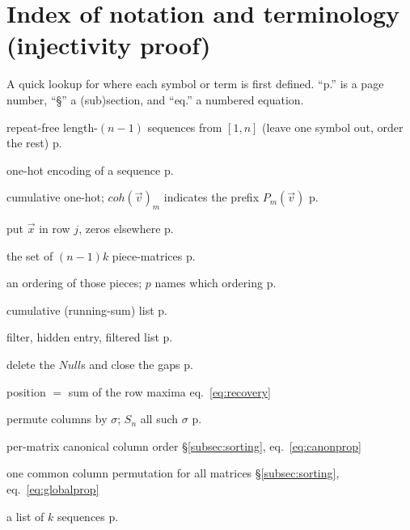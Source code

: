 \section{Index of notation and terminology (injectivity proof)}
\label{app:notation}

A quick lookup for where each symbol or term is first defined.  ``p.'' is a page
number, ``\S'' a (sub)section, and ``eq.'' a numbered equation.

\renewcommand{\arraystretch}{1.25}
\begin{description}\setlength{\itemsep}{1pt}
\item[$s(n)$] repeat-free length-$(n{-}1)$ sequences from $[1,n]$ (leave one symbol out, order the rest) \dotfill p.~\pageref{def:sn}
\item[$oh(\vec v)$] one-hot encoding of a sequence \dotfill p.~\pageref{def:oh}
\item[$coh(\vec v)$] cumulative one-hot; $coh(\vec v)_m$ indicates the prefix $P_m(\vec v)$ \dotfill p.~\pageref{def:coh}
\item[$mat(\vec x,j)$] put $\vec x$ in row $j$, zeros elsewhere \dotfill p.~\pageref{def:mat}
\item[$U(\cdots)$] the set of $(n{-}1)k$ piece-matrices \dotfill p.~\pageref{def:U}
\item[$\vec U(\cdots;p)$, $p$] an ordering of those pieces; $p$ names which ordering \dotfill p.~\pageref{def:ordering}
\item[$C\vec U$] cumulative (running-sum) list \dotfill p.~\pageref{def:CU}
\item[$\vec f$, $Null$, $FC\vec U$] filter, hidden entry, filtered list \dotfill p.~\pageref{def:FCU}
\item[$clean$] delete the $Null$s and close the gaps \dotfill p.~\pageref{def:clean}
\item[position recovery] position $=$ sum of the row maxima \dotfill eq.~\eqref{eq:recovery}
\item[$colPerm(m,\sigma)$, $S_n$] permute columns by $\sigma$; $S_n$ all such $\sigma$ \dotfill p.~\pageref{def:colperm}
\item[$canon$, $localSort$] per-matrix canonical column order \dotfill \S\ref{subsec:sorting}, eq.~\eqref{eq:canonprop}
\item[$globalSort$] one common column permutation for all matrices \dotfill \S\ref{subsec:sorting}, eq.~\eqref{eq:globalprop}
\item[$\vec v,\vec u$ (configuration)] a list of $k$ sequences \dotfill p.~\pageref{def:config}

\end{description}
